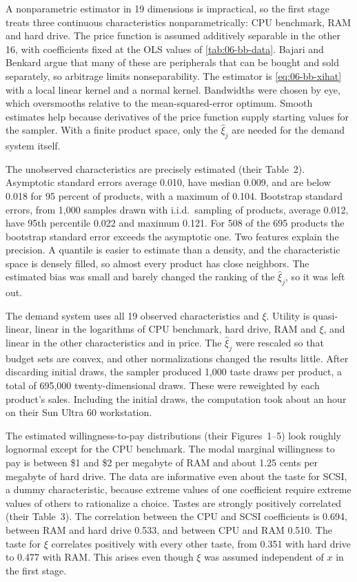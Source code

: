 A nonparametric estimator in 19 dimensions is impractical, so the first stage treats three continuous characteristics
nonparametrically: CPU benchmark, RAM and hard drive. The price function is assumed additively separable in the other 16, with
coefficients fixed at the OLS values of \cref{tab:06-bb-data}. Bajari and Benkard argue that many of these are peripherals that
can be bought and sold separately, so arbitrage limits nonseparability. The estimator is \eqref{eq:06-bb-xihat} with a local
linear kernel and a normal kernel. Bandwidths were chosen by eye, which oversmooths relative to the mean-squared-error optimum.
Smooth estimates help because derivatives of the price function supply starting values for the sampler. With a finite product
space, only the $\hat\xi_j$ are needed for the demand system itself.

The unobserved characteristics are precisely estimated (their Table~2). Asymptotic standard errors average 0.010, have median
0.009, and are below 0.018 for 95 percent of products, with a maximum of 0.104. Bootstrap standard errors, from 1,000 samples
drawn with i.i.d.\ sampling of products, average 0.012, have 95th percentile 0.022 and maximum 0.121. For 508 of the 695
products the bootstrap standard error exceeds the asymptotic one. Two features explain the precision. A quantile is easier to
estimate than a density, and the characteristic space is densely filled, so almost every product has close neighbors. The
estimated bias was small and barely changed the ranking of the $\hat\xi_j$, so it was left out.

The demand system uses all 19 observed characteristics and $\xi$. Utility is quasi-linear, linear in the logarithms of CPU
benchmark, hard drive, RAM and $\xi$, and linear in the other characteristics and in price. The $\hat\xi_j$ were rescaled so
that budget sets are convex, and other normalizations changed the results little. After discarding initial draws, the sampler
produced 1,000 taste draws per product, a total of 695,000 twenty-dimensional draws. These were reweighted by each product's
sales. Including the initial draws, the computation took about an hour on their Sun Ultra 60 workstation.

The estimated willingness-to-pay distributions (their Figures~1--5) look roughly lognormal except for the CPU benchmark. The
modal marginal willingness to pay is between \$1 and \$2 per megabyte of RAM and about 1.25 cents per megabyte of hard drive.
The data are informative even about the taste for SCSI, a dummy characteristic, because extreme values of one coefficient
require extreme values of others to rationalize a choice. Tastes are strongly positively correlated (their Table~3). The
correlation between the CPU and SCSI coefficients is 0.694, between RAM and hard drive 0.533, and between CPU and RAM 0.510. The
taste for $\xi$ correlates positively with every other taste, from 0.351 with hard drive to 0.477 with RAM. This arises even
though $\xi$ was assumed independent of $x$ in the first stage.

